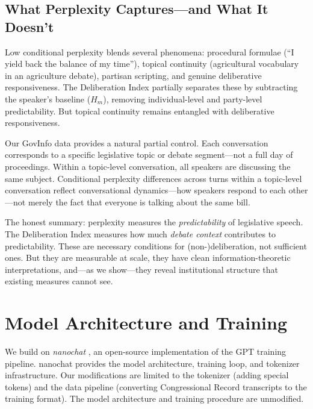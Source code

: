 \documentclass[12pt]{article}
\newcommand{\Hm}{H_m}
\begin{document}
\subsection{What Perplexity Captures---and What It Doesn't}

Low conditional perplexity blends several phenomena: procedural formulae (``I yield back the balance of my time''), topical continuity (agricultural vocabulary in an agriculture debate), partisan scripting, and genuine deliberative responsiveness. The Deliberation Index partially separates these by subtracting the speaker's baseline ($\Hm$), removing individual-level and party-level predictability. But topical continuity remains entangled with deliberative responsiveness.

Our GovInfo data provides a natural partial control. Each conversation corresponds to a specific legislative topic or debate segment---not a full day of proceedings. Within a topic-level conversation, all speakers are discussing the same subject. Conditional perplexity differences across turns within a topic-level conversation reflect conversational dynamics---how speakers respond to each other---not merely the fact that everyone is talking about the same bill.

The honest summary: perplexity measures the \textit{predictability} of legislative speech. The Deliberation Index measures how much \textit{debate context} contributes to predictability. These are necessary conditions for (non-)deliberation, not sufficient ones. But they are measurable at scale, they have clean information-theoretic interpretations, and---as we show---they reveal institutional structure that existing measures cannot see.


\section{Model Architecture and Training}

We build on \textit{nanochat} \citep{karpathy2025}, an open-source implementation of the GPT training pipeline. nanochat provides the model architecture, training loop, and tokenizer infrastructure. Our modifications are limited to the tokenizer (adding special tokens) and the data pipeline (converting Congressional Record transcripts to the training format). The model architecture and training procedure are unmodified.
\end{document}
